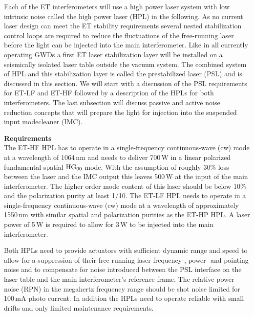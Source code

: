 \label{sec:lasers}


Each of the ET interferometers will use a high power laser system with low
intrinsic noise called the high power laser (HPL) in the following. As no
current laser design can meet the ET stability requirements several nested
stabilization control loops are required to  reduce the fluctuations of the
free-running laser before the light can be injected into the main
interferometer. Like in all currently operating GWDs a first ET laser
stabilization layer will be installed on a seismically isolated laser table
outside the vacuum system. The combined system of HPL and this stabilization
layer is called the prestabilized laser (PSL) and is discussed in this section.
We will start with a discussion of the PSL requirements for ET-LF and ET-HF
followed by a description of the HPLs for both interferometers. The last
subsection will discuss passive and active noise reduction concepts that will
prepare the light for injection into the suspended input modecleaner (IMC).

{\bf Requirements}\\
The ET-HF HPL has to operate in a single-frequency continuous-wave (cw) mode at
a wavelength of 1064\,nm and needs to deliver 700\,W in a linear polarized
fundamental spatial $\rm HG_{00}$ mode. With the assumption of roughly 30\% loss
between the laser and the IMC output this leaves 500\,W at the input of the main
interferometer. The higher order mode content of this laser should be below 10\%
and the polarization purity at least 1/10. The ET-LF HPL needs to operate in a
single-frequency continuous-wave (cw) mode at a wavelength of approximately
1550\,nm with similar spatial and polarization purities as the ET-HP HPL. A
laser power of 5\,W is required to allow for 3\,W to be injected into the main
interferometer. 

Both HPLs need to provide actuators with sufficient dynamic range and speed to
allow for a suppression of their free running laser frequency-, power- and
pointing noise and to compensate for noise introduced between the PSL interface
on the laser table and the main interferometer's reference frame. The relative
power noise (RPN) in the megahertz frequency range should be shot noise limited
for 100\,mA photo current. In addition the HPLs need to operate reliable  with
small drifts and only limited maintenance requirements. 

